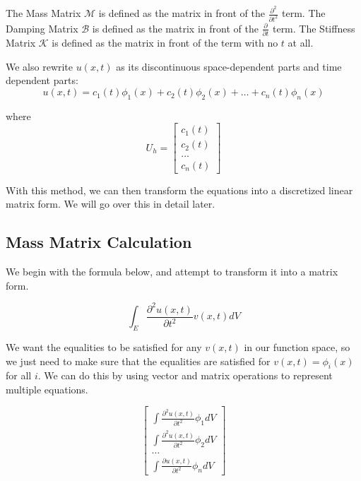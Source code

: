 The Mass Matrix $\mathcal{M}$ is defined as the matrix in front of the $\frac{\partial^2}{\partial t^2}$ term. The Damping Matrix $\mathcal{B}$ is defined as the matrix in front of the $\frac{\partial}{\partial t}$ term. The Stiffness Matrix $\mathcal{K}$ is defined as the matrix in front of the term with no $t$ at all. 

We also rewrite $u(x,t)$ as its discontinuous space-dependent parts and time dependent parts:
\begin{equation}
u(x,t) = c_1(t) \phi_1(x) + c_2(t) \phi_2(x) + \ldots + c_n(t) \phi_n(x)
\end{equation}

where \begin{equation}
U_h = \begin{bmatrix}
c_1(t) \\
c_2(t) \\
\ldots \\
c_n(t)
\end{bmatrix}
\end{equation}

With this method, we can then transform the equations into a discretized linear matrix form. We will go over this in detail later. 


\subsection{Mass Matrix Calculation}

We begin with the formula below, and attempt to transform it into a matrix form.

\begin{equation}
\int_E \frac{\partial^2 u(x,t)}{\partial t^2} v(x,t) dV
\end{equation}

We want the equalities to be satisfied for any $v(x,t)$ in our function space, so we just need to make sure that the equalities are satisfied for $v(x,t) = \phi_i(x)$ for all $i$. We can do this by using vector and matrix operations to represent multiple equations.

\begin{equation}
\begin{bmatrix}
\int \frac{\partial^2 u(x,t)}{\partial t^2} \phi_1 dV \\
\int \frac{\partial^2 u(x,t)}{\partial t^2} \phi_2 dV \\
\ldots \\
\int \frac{\partial{u(x,t)}}{\partial t^2} \phi_n dV
\end{bmatrix}
\end{equation}

